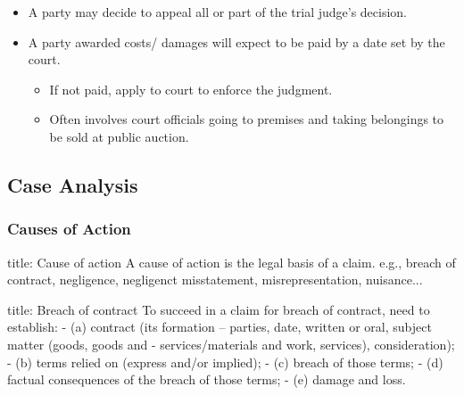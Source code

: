 \documentclass[
]{article}
\newenvironment{Shaded}{}{}
\newcommand{\NormalTok}[1]{#1}
\providecommand{\tightlist}{%
  \setlength{\itemsep}{0pt}\setlength{\parskip}{0pt}}
\begin{document}
\begin{itemize}
\tightlist
\item
  A party may decide to appeal all or part of the trial judge's
  decision.
\item
  A party awarded costs/ damages will expect to be paid by a date set by
  the court.

  \begin{itemize}
  \tightlist
  \item
    If not paid, apply to court to enforce the judgment.
  \item
    Often involves court officials going to premises and taking
    belongings to be sold at public auction.
  \end{itemize}
\end{itemize}

\hypertarget{case-analysis}{%
\subsection{Case Analysis}\label{case-analysis}}

\hypertarget{causes-of-action}{%
\subsubsection{Causes of Action}\label{causes-of-action}}

\begin{Shaded}
\begin{Highlighting}[]
\NormalTok{title: Cause of action}
\NormalTok{A cause of action is the legal basis of a claim. e.g., breach of contract, negligence, negligenct misstatement, misrepresentation, nuisance... }
\end{Highlighting}
\end{Shaded}

\begin{Shaded}
\begin{Highlighting}[]
\NormalTok{title: Breach of contract}
\NormalTok{To succeed in a claim for breach of contract, need to establish:}
\NormalTok{{-} (a) contract (its formation – parties, date, written or oral, subject matter (goods, goods and}
\NormalTok{{-} services/materials and work, services), consideration);}
\NormalTok{{-} (b) terms relied on (express and/or implied);}
\NormalTok{{-} (c) breach of those terms;}
\NormalTok{{-} (d) factual consequences of the breach of those terms;}
\NormalTok{{-} (e) damage and loss.}
\end{Highlighting}
\end{Shaded}
\end{document}
